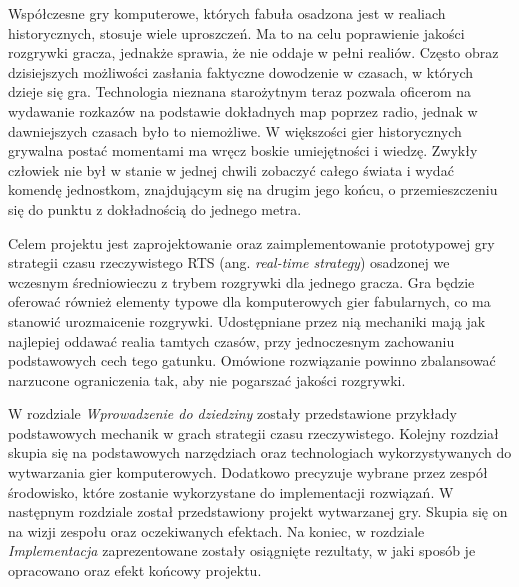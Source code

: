 Współczesne gry komputerowe, których fabuła osadzona jest w realiach historycznych, stosuje wiele uproszczeń. Ma to na celu poprawienie jakości
rozgrywki gracza, jednakże sprawia, że nie oddaje w pełni realiów. Często obraz dzisiejszych możliwości zasłania faktyczne dowodzenie
w czasach, w których dzieje się gra. Technologia nieznana starożytnym teraz pozwala oficerom na wydawanie rozkazów na podstawie dokładnych map poprzez radio,
jednak w dawniejszych czasach było to niemożliwe. W większości gier historycznych grywalna postać momentami ma wręcz boskie umiejętności i wiedzę. Zwykły człowiek nie był w
stanie w jednej chwili zobaczyć całego świata i wydać komendę jednostkom, znajdującym się na drugim jego końcu, o przemieszczeniu
się do punktu z dokładnością do jednego metra.

Celem projektu jest zaprojektowanie oraz zaimplementowanie prototypowej gry strategii czasu rzeczywistego RTS
(ang. \textit{real-time strategy}) osadzonej we wczesnym średniowieczu z trybem rozgrywki dla jednego gracza. Gra będzie
oferować również elementy typowe dla komputerowych gier fabularnych, co ma stanowić urozmaicenie rozgrywki. 
Udostępniane przez nią mechaniki mają jak najlepiej oddawać realia tamtych czasów, przy
jednoczesnym zachowaniu podstawowych cech tego gatunku. Omówione rozwiązanie powinno zbalansować narzucone ograniczenia tak, aby 
nie pogarszać jakości rozgrywki.

W rozdziale \textit{Wprowadzenie do dziedziny} zostały przedstawione przykłady podstawowych mechanik w grach strategii czasu
rzeczywistego. Kolejny rozdział skupia się na podstawowych narzędziach oraz technologiach wykorzystywanych do wytwarzania
gier komputerowych. Dodatkowo precyzuje wybrane przez zespół środowisko, które zostanie wykorzystane do implementacji
rozwiązań. W następnym rozdziale został przedstawiony projekt wytwarzanej gry. Skupia się on na wizji zespołu oraz
oczekiwanych efektach. Na koniec, w rozdziale \textit{Implementacja} zaprezentowane zostały osiągnięte rezultaty, w jaki
sposób je opracowano oraz efekt końcowy projektu.

